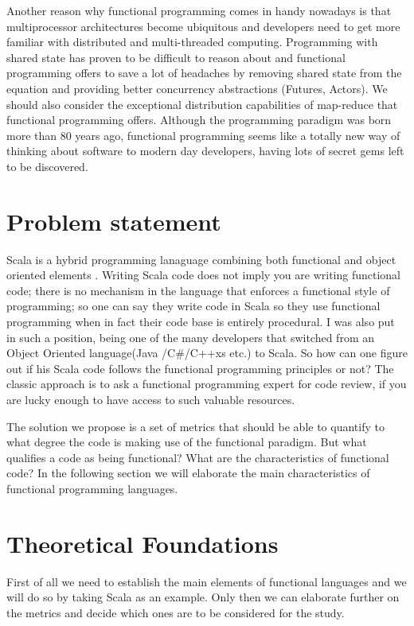 \documentclass{article}
\begin{document}
Another reason why functional programming comes in handy nowadays is that multiprocessor architectures become ubiquitous and developers need to get more familiar with distributed and multi-threaded computing. Programming with shared state has proven to be  difficult to reason about and functional programming offers to save a lot of headaches by removing shared state from the equation and providing better concurrency abstractions (Futures, Actors). We should also consider  the exceptional distribution capabilities of map-reduce that functional programming offers. Although the programming paradigm was born more than 80 years ago, functional programming seems like a totally new way of thinking about software to modern day developers, having lots of secret gems left to be discovered. \par

\section {Problem statement}
Scala is a hybrid programming lanaguage combining both  functional and  object oriented elements \cite{scalalang:1}. Writing Scala code does not imply you are writing functional code;  there is no mechanism in the language that enforces a functional style of programming; so one can say they write code in Scala so they use functional programming when in fact their code base is entirely procedural. I was also put in such a position,  being one of the many  developers that switched from an Object Oriented language(Java /C\#/C++xs etc.)  to Scala. So how can one figure out if his Scala code follows the functional programming principles or not? The classic approach is to ask a functional programming expert for code review, if you are lucky enough to have access to such valuable resources. \par

The solution we propose is a set of metrics that should be able to quantify to what degree the code is making use of the functional paradigm. But what  qualifies a code as being functional? What are the characteristics of functional code? In the following section we will elaborate the main characteristics of functional programming languages.\par

\section {Theoretical Foundations}
First of all we need to establish the main elements of functional languages and we will do so by taking Scala as an example. Only then we can elaborate further on the metrics and decide which ones are to be considered for the study. \par
\end{document}

